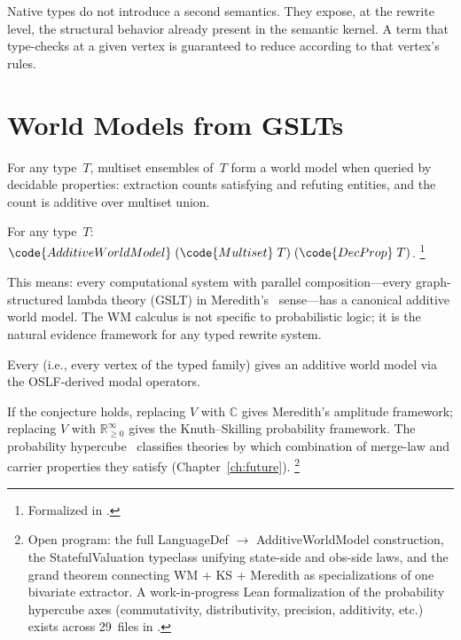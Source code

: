 \documentclass[11pt,openany]{report}
\begin{document}
Native types do not introduce a second semantics.  They expose, at
the rewrite level, the structural behavior already present in the
semantic kernel.  A term that type-checks at a given vertex is
guaranteed to reduce according to that vertex's rules.


\section{World Models from GSLTs}
\label{sec:gslt-open-program}

For any type~$T$, multiset ensembles of~$T$ form a world model when
queried by decidable properties: extraction counts satisfying and
refuting entities, and the count is additive over multiset union.

\begin{theorem}
\label{thm:universalEnsembleWorldModel}
For any type~$T$:
$\code{AdditiveWorldModel}\;(\code{Multiset}\;T)\;(\code{DecProp}\;T)$.%
\footnote{Formalized in
.}
\end{theorem}

\noindent
This means: every computational system with parallel composition---every
graph-structured lambda theory (GSLT) in
Meredith's~\cite{meredith2026ccc} sense---has a canonical additive
world model.  The WM calculus is not specific to probabilistic
logic; it is the natural evidence framework for any typed rewrite
system.

\begin{conjecture}
\label{conj:langdef-universality}
Every  (i.e., every vertex of the typed family)
gives an additive world model via the OSLF-derived modal operators.
\end{conjecture}

\noindent
If the conjecture holds, replacing $V$ with $\mathbb{C}$ gives
Meredith's amplitude framework; replacing $V$ with
$\mathbb{R}_{\ge 0}^\infty$ gives the Knuth--Skilling probability
framework.  The probability
hypercube~\cite{StayWells2026} classifies theories by which
combination of merge-law and carrier properties they satisfy
(Chapter~\ref{ch:future}).%
\footnote{Open program: the full LanguageDef $\to$ AdditiveWorldModel
construction, the StatefulValuation typeclass unifying state-side and
obs-side laws, and the grand theorem connecting WM + KS + Meredith as
specializations of one bivariate extractor.  A work-in-progress Lean formalization
of the probability hypercube axes (commutativity, distributivity,
precision, additivity, etc.) exists across 29~files in
.}
\end{document}
